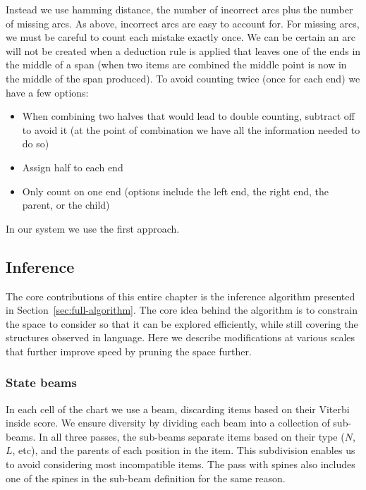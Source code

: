 Instead we use hamming distance, the number of incorrect arcs plus the number of missing arcs.
As above, incorrect arcs are easy to account for.
For missing arcs, we must be careful to count each mistake exactly once.
We can be certain an arc will not be created when a deduction rule is applied that leaves one of the ends in the middle of a span (\myeg when two items are combined the middle point is now in the middle of the span produced).
To avoid counting twice (once for each end) we have a few options:

\begin{itemize}
  \item When combining two halves that would lead to double counting, subtract off to avoid it (at the point of combination we have all the information needed to do so)
  \item Assign half to each end
  \item Only count on one end (options include the left end, the right end, the parent, or the child)
\end{itemize}

\noindent
In our system we use the first approach.

\subsection{Inference}

The core contributions of this entire chapter is the inference algorithm presented in Section~\ref{sec:full-algorithm}.
The core idea behind the algorithm is to constrain the space to consider so that it can be explored efficiently, while still covering the structures observed in language.
Here we describe modifications at various scales that further improve speed by pruning the space further.

\subsubsection{State beams}

In each cell of the chart we use a beam, discarding items based on their Viterbi inside score.
We ensure diversity by dividing each beam into a collection of sub-beams.
In all three passes, the sub-beams separate items based on their type ($N$, $L$, etc), and the parents of each position in the item.
This subdivision enables us to avoid considering most incompatible items.
The pass with spines also includes one of the spines in the sub-beam definition for the same reason.

